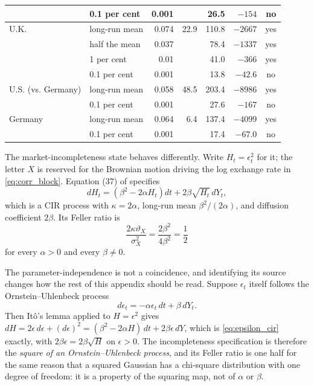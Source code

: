 \documentclass[11pt]{article}
\theoremstyle{definition}
\begin{document}
\begin{table}[htbp]
\begin{tabular}{llrrrrc}
 & 0.1 per cent & 0.001 & & 26.5 & $-154$ & no \\
\midrule
U.K. & long-run mean & 0.074 & 22.9 & 110.8 & $-2667$ & yes \\
 & half the mean & 0.037 & & 78.4 & $-1337$ & yes \\
 & 1 per cent & 0.01 & & 41.0 & $-366$ & yes \\
 & 0.1 per cent & 0.001 & & 13.8 & $-42.6$ & no \\
\midrule
U.S. (vs. Germany) & long-run mean & 0.058 & 48.5 & 203.4 & $-8986$ & yes \\
 & 0.1 per cent & 0.001 & & 27.6 & $-167$ & no \\
\midrule
Germany & long-run mean & 0.064 & 6.4 & 137.4 & $-4099$ & yes \\
 & 0.1 per cent & 0.001 & & 17.4 & $-67.0$ & no \\
\bottomrule
\end{tabular}
\end{table}

The market-incompleteness state behaves differently. Write $H_t=\epsilon_t^2$ for it; the letter $X$ is reserved for the Brownian motion driving the log exchange rate in \eqref{eq:corr_block}. Equation (37) of \citet{BrandtSantaClara2002} specifies
\begin{equation}\label{eq:epsilon_cir}
dH_t=(\beta^2-2\alpha H_t)dt+2\beta\sqrt{H_t}\,dY_t,
\end{equation}
which is a CIR process with $\kappa=2\alpha$, long-run mean $\beta^2/(2\alpha)$, and diffusion coefficient $2\beta$. Its Feller ratio is
\[
\frac{2\kappa\vartheta_X}{\sigma_X^2}
=\frac{2\beta^2}{4\beta^2}
=\frac12
\]
for every $\alpha>0$ and every $\beta\ne0$.

The parameter-independence is not a coincidence, and identifying its source changes how the rest of this appendix should be read. Suppose $\epsilon_t$ itself follows the Ornstein--Uhlenbeck process
\begin{equation}\label{eq:epsilon_ou}
d\epsilon_t=-\alpha\epsilon_t\,dt+\beta\,dY_t .
\end{equation}
Then It\^o's lemma applied to $H=\epsilon^2$ gives $dH=2\epsilon\,d\epsilon+(d\epsilon)^2=(\beta^2-2\alpha H)\,dt+2\beta\epsilon\,dY$, which is \eqref{eq:epsilon_cir} exactly, with $2\beta\epsilon=2\beta\sqrt H$ on $\epsilon>0$. The incompleteness specification is therefore the \emph{square of an Ornstein--Uhlenbeck process}, and its Feller ratio is one half for the same reason that a squared Gaussian has a chi-square distribution with one degree of freedom: it is a property of the squaring map, not of $\alpha$ or $\beta$.
\end{document}
